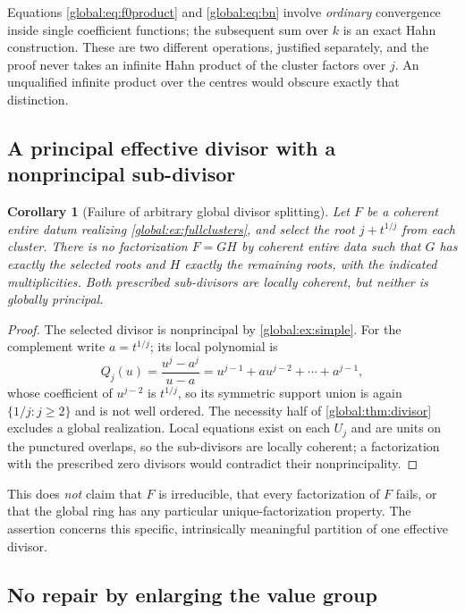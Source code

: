 \documentclass[11pt,letterpaper]{article}
\newtheorem{corollary}[corollary]{Corollary}
\theoremstyle{definition}
\theoremstyle{remark}
\numberwithin{equation}{section}
\begin{document}
Equations \eqref{global:eq:f0product} and \eqref{global:eq:bn} involve \emph{ordinary} convergence inside single coefficient functions; the subsequent sum over $k$ is an exact Hahn construction. These are two different operations, justified separately, and the proof never takes an infinite Hahn product of the cluster factors over $j$. An unqualified infinite product over the centres would obscure exactly that distinction.

\subsection{A principal effective divisor with a nonprincipal sub-divisor}

\begin{corollary}[Failure of arbitrary global divisor splitting]\label{global:cor:splitting}
Let $F$ be a coherent entire datum realizing \cref{global:ex:fullclusters}, and select the root $j+t^{1/j}$ from each cluster. There is no factorization $F=GH$ by coherent entire data such that $G$ has exactly the selected roots and $H$ exactly the remaining roots, with the indicated multiplicities. Both prescribed sub-divisors are locally coherent, but neither is globally principal.
\end{corollary}

\begin{proof}
The selected divisor is nonprincipal by \cref{global:ex:simple}. For the complement write $a=t^{1/j}$; its local polynomial is
\[
  Q_j(u)=\frac{u^j-a^j}{u-a}=u^{j-1}+au^{j-2}+\cdots+a^{j-1},
\]
whose coefficient of $u^{j-2}$ is $t^{1/j}$, so its symmetric support union is again $\{1/j:j\ge2\}$ and is not well ordered. The necessity half of \cref{global:thm:divisor} excludes a global realization. Local equations exist on each $U_j$ and are units on the punctured overlaps, so the sub-divisors are locally coherent; a factorization with the prescribed zero divisors would contradict their nonprincipality.
\end{proof}

This does \emph{not} claim that $F$ is irreducible, that every factorization of $F$ fails, or that the global ring has any particular unique-factorization property. The assertion concerns this specific, intrinsically meaningful partition of one effective divisor.

\subsection{No repair by enlarging the value group}\label{global:sub:norepair}
\end{document}
